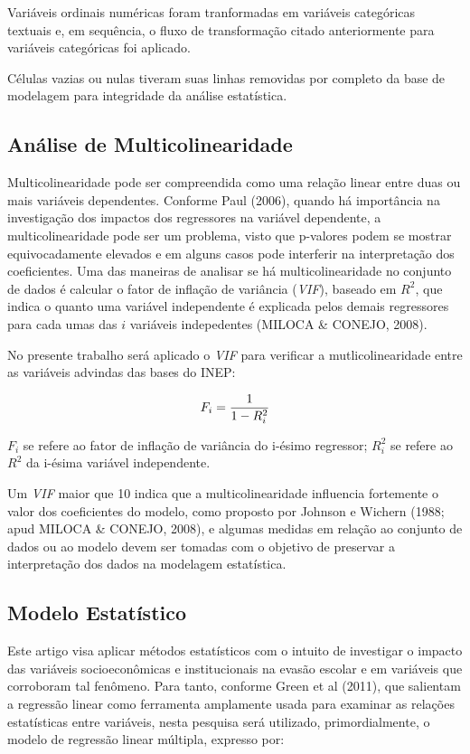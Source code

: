\documentclass[english, spanish, brazilian]{RBIEarticle} %
\begin{document}
Variáveis ordinais numéricas foram tranformadas em variáveis categóricas textuais e, em sequência, o fluxo de transformação citado anteriormente para variáveis categóricas foi aplicado.

Células vazias ou nulas tiveram suas linhas removidas por completo da base de modelagem para integridade da análise estatística.

\subsection{Análise de Multicolinearidade}
Multicolinearidade pode ser compreendida como uma relação linear entre duas ou mais variáveis dependentes. Conforme Paul (2006), quando há importância na investigação dos impactos dos regressores na variável dependente, a multicolinearidade pode ser um problema, visto que p-valores podem se mostrar equivocadamente elevados e em alguns casos pode interferir na interpretação dos coeficientes. Uma das maneiras de analisar se há multicolinearidade no conjunto de dados é calcular o fator de inflação de variância (\textit{VIF}), baseado em $R^2$, que indica o quanto uma variável independente é explicada pelos demais regressores para cada umas das $i$ variáveis indepedentes (MILOCA \& CONEJO, 2008).

No presente trabalho será aplicado o \textit{VIF} para verificar a mutlicolinearidade entre as variáveis advindas das bases do INEP:

\vspace{0.5cm}
\begin{equation}
\large F_i = \frac{1}{1-R_i^2}
\end{equation}
\vspace{0.5cm}


$F_i$ se refere ao fator de inflação de variância do i-ésimo regressor; $R_i^2$ se refere ao $R^2$ da i-ésima variável independente.

Um \textit{VIF} maior que 10 indica que a multicolinearidade influencia fortemente o valor dos coeficientes do modelo, como proposto por Johnson e Wichern (1988; apud MILOCA \& CONEJO, 2008), e algumas medidas em relação ao conjunto de dados ou ao modelo devem ser tomadas com o objetivo de preservar a interpretação dos dados na modelagem estatística.

\subsection{Modelo Estatístico}
Este artigo visa aplicar métodos estatísticos com o intuito de investigar o impacto das variáveis socioeconômicas e institucionais na evasão escolar e em variáveis que corroboram tal fenômeno. Para tanto, conforme Green et al (2011), que salientam a regressão linear como ferramenta amplamente usada para examinar as relações estatísticas entre variáveis, nesta pesquisa será utilizado, primordialmente, o modelo de regressão linear múltipla, expresso por:
\end{document}
